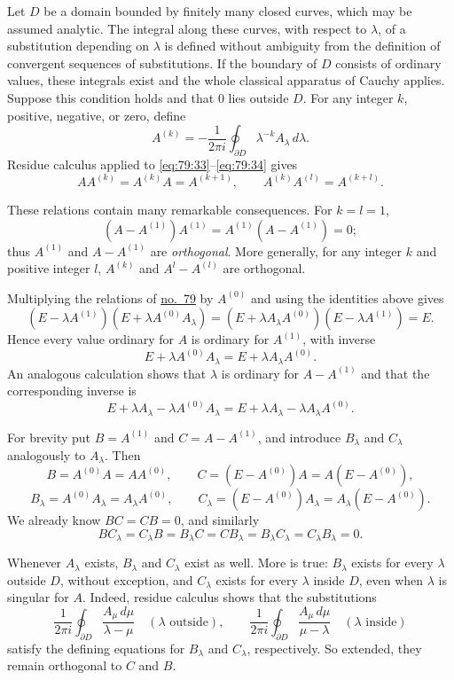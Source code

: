 \documentclass[
  paper=b5,
  fontsize=13pt,
  twoside=true,
  open=any,
  bookmarkpackage=false,
  chapterprefix=true,
  headings=normal
]{scrbook}
\theoremstyle{definition}
\begin{document}
Let $D$ be a domain bounded by finitely many closed curves, which may be
assumed analytic. The integral along these curves, with respect to
$\lambda$, of a substitution depending on $\lambda$ is defined without
ambiguity from the definition of convergent sequences of substitutions. If
the boundary of $D$ consists of ordinary values, these integrals exist and
the whole classical apparatus of Cauchy applies. Suppose this condition
holds and that $0$ lies outside $D$. For any integer $k$, positive,
negative, or zero, define
\[
  A^{(k)}=-\frac1{2\pi i}\oint_{\partial D}
  \lambda^{-k}A_\lambda\,d\lambda.
\]
Residue calculus applied to \eqref{eq:79:33}--\eqref{eq:79:34} gives
\[
 AA^{(k)}=A^{(k)}A=A^{(k+1)},
 \qquad
 A^{(k)}A^{(l)}=A^{(k+l)}.
\]

These relations contain many remarkable consequences. For $k=l=1$,
\[
 (A-A^{(1)})A^{(1)}=A^{(1)}(A-A^{(1)})=0;
\]
thus $A^{(1)}$ and $A-A^{(1)}$ are \emph{orthogonal}. More generally, for
any integer $k$ and positive integer $l$, $A^{(k)}$ and
$A^l-A^{(l)}$ are orthogonal.

Multiplying the relations of \hyperref[sec:79]{no.~79} by $A^{(0)}$ and
using the identities above gives
\[
 (E-\lambda A^{(1)})(E+\lambda A^{(0)}A_\lambda)
 =(E+\lambda A_\lambda A^{(0)})(E-\lambda A^{(1)})=E.
\]
Hence every value ordinary for $A$ is ordinary for $A^{(1)}$, with inverse
\[
 E+\lambda A^{(0)}A_\lambda
 =E+\lambda A_\lambda A^{(0)}.
\]
An analogous calculation shows that $\lambda$ is ordinary for
$A-A^{(1)}$ and that the corresponding inverse is
\[
 E+\lambda A_\lambda-\lambda A^{(0)}A_\lambda
 =E+\lambda A_\lambda-\lambda A_\lambda A^{(0)}.
\]

For brevity put $B=A^{(1)}$ and $C=A-A^{(1)}$, and introduce $B_\lambda$
and $C_\lambda$ analogously to $A_\lambda$. Then
\[
 B=A^{(0)}A=AA^{(0)},
 \qquad C=(E-A^{(0)})A=A(E-A^{(0)}),
\]
\[
 B_\lambda=A^{(0)}A_\lambda=A_\lambda A^{(0)},
 \qquad
 C_\lambda=(E-A^{(0)})A_\lambda=A_\lambda(E-A^{(0)}).
\]
We already know $BC=CB=0$, and similarly
\[
 BC_\lambda=C_\lambda B=B_\lambda C=CB_\lambda
 =B_\lambda C_\lambda=C_\lambda B_\lambda=0.
\]

Whenever $A_\lambda$ exists, $B_\lambda$ and $C_\lambda$ exist as well.
More is true: $B_\lambda$ exists for every $\lambda$ outside $D$, without
exception, and $C_\lambda$ exists for every $\lambda$ inside $D$, even when
$\lambda$ is singular for $A$. Indeed, residue calculus shows that the
substitutions
\[
 \frac1{2\pi i}\oint_{\partial D}
   \frac{A_\mu\,d\mu}{\lambda-\mu}
 \quad(\lambda\text{ outside}),
 \qquad
 \frac1{2\pi i}\oint_{\partial D}
   \frac{A_\mu\,d\mu}{\mu-\lambda}
 \quad(\lambda\text{ inside})
\]
satisfy the defining equations for $B_\lambda$ and $C_\lambda$,
respectively. So extended, they remain orthogonal to $C$ and $B$.
\end{document}
